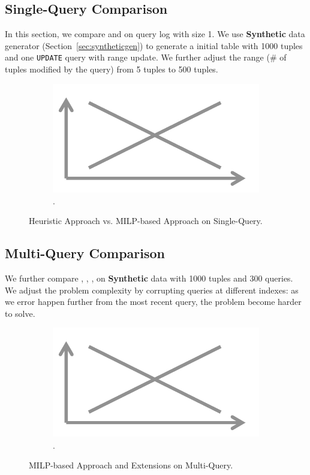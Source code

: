 {\color{blue}
\subsection{Single-Query Comparison}
In this section, we compare \heurstic and \milpall on query log with size 1. 
We use \textbf{Synthetic} data generator (Section~\ref{sec:syntheticgen}) 
to generate a initial table with 1000 tuples and one 
\texttt{UPDATE} query with range update. 
We further adjust the range (\# of tuples modified by the query) 
from 5 tuples to 500 tuples. 

 \begin{figure}[h]
\centering
  \begin{subfigure}[t]{.48\columnwidth}
  \includegraphics[width = .95\columnwidth]{figures/placeholder}
  \caption{.}
  \label{f:heursticvsmilp} 
  \end{subfigure}
  \caption{Heuristic Approach vs. MILP-based Approach on Single-Query. }
\end{figure}

\subsection{Multi-Query Comparison}
We further compare \milpall, \milptuple, \milptuplestopearly, \milpadvtuple  
on \textbf{Synthetic} data 
with 1000 tuples and 300 queries. We adjust the problem complexity by corrupting queries 
at different indexes: as we error happen further from the most recent query, 
the problem become harder to solve. 

 \begin{figure}[h]
\centering
  \begin{subfigure}[t]{.48\columnwidth}
  \includegraphics[width = .95\columnwidth]{figures/placeholder}
  \caption{.}
  \label{f:multiquery} 
  \end{subfigure}
  \caption{MILP-based Approach and Extensions on Multi-Query. }
\end{figure}

}
